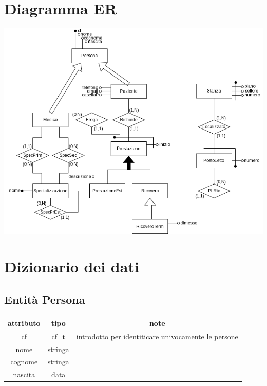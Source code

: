 \documentclass[a4paper,12pt]{report}
\begin{document}
    \chapter{Diagramma ER}
      \includegraphics[width=1\textwidth]{er.png}
    \chapter{Dizionario dei dati}
      \section*{Entità Persona}
        \begin{tabular}{|c|c|c|}
	        \hline attributo & tipo & note \\
	        \hline cf & cf\_t & introdotto per identiticare univocamente le persone \\
	        \hline nome & stringa & \\
	        \hline cognome & stringa & \\
	        \hline nascita & data & \\
	        \hline
        \end{tabular} \\
\end{document}

